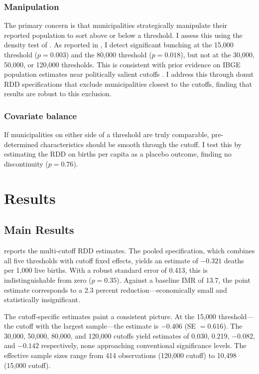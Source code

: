 \documentclass[12pt]{article}
\begin{document}
\subsubsection*{Manipulation} The primary concern is that municipalities strategically manipulate their reported population to sort above or below a threshold. I assess this using the density test of \citet{cattaneo2020simple}. As reported in , I detect significant bunching at the 15,000 threshold ($p = 0.003$) and the 80,000 threshold ($p = 0.018$), but not at the 30,000, 50,000, or 120,000 thresholds. This is consistent with prior evidence on IBGE population estimates near politically salient cutoffs \citep{litschig2012impact}. I address this through donut RDD specifications that exclude municipalities closest to the cutoffs, finding that results are robust to this exclusion.

\subsubsection*{Covariate balance} If municipalities on either side of a threshold are truly comparable, pre-determined characteristics should be smooth through the cutoff. I test this by estimating the RDD on births per capita as a placebo outcome, finding no discontinuity ($p = 0.76$).


\section{Results}

\subsection{Main Results}

 reports the multi-cutoff RDD estimates. The pooled specification, which combines all five thresholds with cutoff fixed effects, yields an estimate of $-0.321$ deaths per 1,000 live births. With a robust standard error of 0.413, this is indistinguishable from zero ($p = 0.35$). Against a baseline IMR of 13.7, the point estimate corresponds to a 2.3 percent reduction---economically small and statistically insignificant.

The cutoff-specific estimates paint a consistent picture. At the 15,000 threshold---the cutoff with the largest sample---the estimate is $-0.406$ (SE $= 0.616$). The 30,000, 50,000, 80,000, and 120,000 cutoffs yield estimates of 0.030, 0.219, $-0.082$, and $-0.142$ respectively, none approaching conventional significance levels. The effective sample sizes range from 414 observations (120,000 cutoff) to 10,498 (15,000 cutoff).
\end{document}
